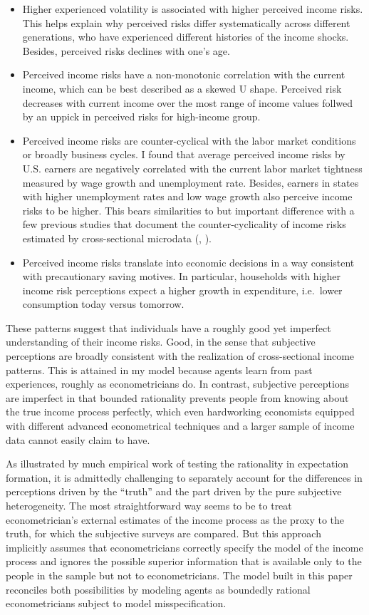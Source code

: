 \documentclass[12pt,notitlepage,onecolumn,aps,pra]{article}
\begin{document}
\begin{itemize}
\item
  Higher experienced volatility is associated with higher perceived
  income risks. This helps explain why perceived risks differ
  systematically across different generations, who have experienced
  different histories of the income shocks. Besides, perceived risks
  declines with one's age.
\item
  Perceived income risks have a non-monotonic correlation with the
  current income, which can be best described as a skewed U shape.
  Perceived risk decreases with current income over the most range of
  income values follwed by an uppick in perceived risks for high-income
  group.
\item
  Perceived income risks are counter-cyclical with the labor market
  conditions or broadly business cycles. I found that average perceived
  income risks by U.S. earners are negatively correlated with the
  current labor market tightness measured by wage growth and
  unemployment rate. Besides, earners in states with higher unemployment
  rates and low wage growth also perceive income risks to be higher.
  This bears similarities to but important difference with a few
  previous studies that document the counter-cyclicality of income risks
  estimated by cross-sectional microdata (\cite{guvenen2014nature},
  \cite{catherine_countercyclical_2019}).
\item
  Perceived income risks translate into economic decisions in a way
  consistent with precautionary saving motives. In particular,
  households with higher income risk perceptions expect a higher growth
  in expenditure, i.e.~lower consumption today versus tomorrow.
\end{itemize}

These patterns suggest that individuals have a roughly good yet
imperfect understanding of their income risks. Good, in the sense that
subjective perceptions are broadly consistent with the realization of
cross-sectional income patterns. This is attained in my model because
agents learn from past experiences, roughly as econometricians do. In
contrast, subjective perceptions are imperfect in that bounded
rationality prevents people from knowing about the true income process
perfectly, which even hardworking economists equipped with different
advanced econometrical techniques and a larger sample of income data
cannot easily claim to have.

As illustrated by much empirical work of testing the rationality in
expectation formation, it is admittedly challenging to separately
account for the differences in perceptions driven by the ``truth'' and
the part driven by the pure subjective heterogeneity. The most
straightforward way seems to be to treat econometrician's external
estimates of the income process as the proxy to the truth, for which the
subjective surveys are compared. But this approach implicitly assumes
that econometricians correctly specify the model of the income process
and ignores the possible superior information that is available only to
the people in the sample but not to econometricians. The model built in
this paper reconciles both possibilities by modeling agents as boundedly
rational econometricians subject to model misspecification.
\end{document}

